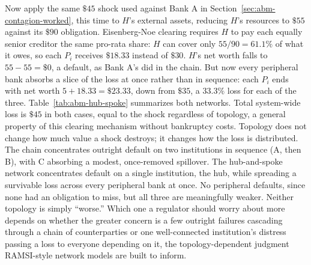 \documentclass[../ai_in_finance]{subfiles}
\begin{document}
Now apply the same $\$45$ shock used against Bank A in Section~\ref{sec:abm-contagion-worked}, this time to $H$'s external assets, reducing $H$'s resources to $\$55$ against its $\$90$ obligation. Eisenberg-Noe clearing requires $H$ to pay each equally senior creditor the same pro-rata share: $H$ can cover only $55/90=61.1\%$ of what it owes, so each $P_i$ receives $\$18.33$ instead of $\$30$. $H$'s net worth falls to $55-55=\$0$, a default, as Bank A's did in the chain. But now every peripheral bank absorbs a slice of the loss at once rather than in sequence: each $P_i$ ends with net worth $5+18.33=\$23.33$, down from $\$35$, a $33.3\%$ loss for each of the three. Table~\ref{tab:abm-hub-spoke} summarizes both networks. Total system-wide loss is $\$45$ in both cases, equal to the shock regardless of topology, a general property of this clearing mechanism without bankruptcy costs. Topology does not change how much value a shock destroys; it changes how the loss is distributed. The chain concentrates outright default on two institutions in sequence (A, then B), with C absorbing a modest, once-removed spillover. The hub-and-spoke network concentrates default on a single institution, the hub, while spreading a survivable loss across every peripheral bank at once. No peripheral defaults, since none had an obligation to miss, but all three are meaningfully weaker. Neither topology is simply ``worse.'' Which one a regulator should worry about more depends on whether the greater concern is a few outright failures cascading through a chain of counterparties or one well-connected institution's distress passing a loss to everyone depending on it, the topology-dependent judgment RAMSI-style network models are built to inform.
\end{document}
